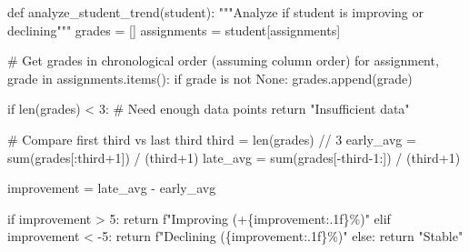 \documentclass[
  letterpaper,
  DIV=11,
  numbers=noendperiod,
  oneside]{scrreprt}
\newenvironment{Shaded}{}{}
\newcommand{\BuiltInTok}[1]{\textcolor[rgb]{0.84,0.23,0.29}{#1}}
\newcommand{\CommentTok}[1]{\textcolor[rgb]{0.42,0.45,0.49}{#1}}
\newcommand{\ControlFlowTok}[1]{\textcolor[rgb]{0.84,0.23,0.29}{#1}}
\newcommand{\DecValTok}[1]{\textcolor[rgb]{0.00,0.36,0.77}{#1}}
\newcommand{\KeywordTok}[1]{\textcolor[rgb]{0.84,0.23,0.29}{#1}}
\newcommand{\NormalTok}[1]{\textcolor[rgb]{0.14,0.16,0.18}{#1}}
\newcommand{\OperatorTok}[1]{\textcolor[rgb]{0.14,0.16,0.18}{#1}}
\newcommand{\SpecialCharTok}[1]{\textcolor[rgb]{0.00,0.36,0.77}{#1}}
\newcommand{\SpecialStringTok}[1]{\textcolor[rgb]{0.01,0.18,0.38}{#1}}
\newcommand{\StringTok}[1]{\textcolor[rgb]{0.01,0.18,0.38}{#1}}
\newcommand{\VariableTok}[1]{\textcolor[rgb]{0.89,0.38,0.04}{#1}}
\begin{document}
\begin{Shaded}
\begin{Highlighting}[]
\KeywordTok{def}\NormalTok{ analyze\_student\_trend(student):}
    \CommentTok{"""Analyze if student is improving or declining"""}
\NormalTok{    grades }\OperatorTok{=}\NormalTok{ []}
\NormalTok{    assignments }\OperatorTok{=}\NormalTok{ student[}\StringTok{\textquotesingle{}assignments\textquotesingle{}}\NormalTok{]}
    
    \CommentTok{\# Get grades in chronological order (assuming column order)}
    \ControlFlowTok{for}\NormalTok{ assignment, grade }\KeywordTok{in}\NormalTok{ assignments.items():}
        \ControlFlowTok{if}\NormalTok{ grade }\KeywordTok{is} \KeywordTok{not} \VariableTok{None}\NormalTok{:}
\NormalTok{            grades.append(grade)}
    
    \ControlFlowTok{if} \BuiltInTok{len}\NormalTok{(grades) }\OperatorTok{\textless{}} \DecValTok{3}\NormalTok{:  }\CommentTok{\# Need enough data points}
        \ControlFlowTok{return} \StringTok{"Insufficient data"}
    
    \CommentTok{\# Compare first third vs last third}
\NormalTok{    third }\OperatorTok{=} \BuiltInTok{len}\NormalTok{(grades) }\OperatorTok{//} \DecValTok{3}
\NormalTok{    early\_avg }\OperatorTok{=} \BuiltInTok{sum}\NormalTok{(grades[:third}\OperatorTok{+}\DecValTok{1}\NormalTok{]) }\OperatorTok{/}\NormalTok{ (third}\OperatorTok{+}\DecValTok{1}\NormalTok{)}
\NormalTok{    late\_avg }\OperatorTok{=} \BuiltInTok{sum}\NormalTok{(grades[}\OperatorTok{{-}}\NormalTok{third}\OperatorTok{{-}}\DecValTok{1}\NormalTok{:]) }\OperatorTok{/}\NormalTok{ (third}\OperatorTok{+}\DecValTok{1}\NormalTok{)}
    
\NormalTok{    improvement }\OperatorTok{=}\NormalTok{ late\_avg }\OperatorTok{{-}}\NormalTok{ early\_avg}
    
    \ControlFlowTok{if}\NormalTok{ improvement }\OperatorTok{\textgreater{}} \DecValTok{5}\NormalTok{:}
        \ControlFlowTok{return} \SpecialStringTok{f"Improving (+}\SpecialCharTok{\{}\NormalTok{improvement}\SpecialCharTok{:.1f\}}\SpecialStringTok{\%)"}
    \ControlFlowTok{elif}\NormalTok{ improvement }\OperatorTok{\textless{}} \OperatorTok{{-}}\DecValTok{5}\NormalTok{:}
        \ControlFlowTok{return} \SpecialStringTok{f"Declining (}\SpecialCharTok{\{}\NormalTok{improvement}\SpecialCharTok{:.1f\}}\SpecialStringTok{\%)"}
    \ControlFlowTok{else}\NormalTok{:}
        \ControlFlowTok{return} \StringTok{"Stable"}
\end{Highlighting}
\end{Shaded}
\end{document}
